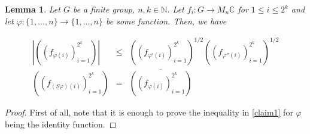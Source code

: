 \documentclass[a4paper,11pt]{amsproc}
\theoremstyle{plain}
\newtheorem{lemma}[theorem]{Lemma}
\theoremstyle{definition}
\begin{document}
\begin{lemma}
Let $G$ be a finite group, $n,k \in \mathbb N$. Let $f_i \colon G \to M_n \mathbb C$ for $1 \leq i \leq 2^k$ and let $\varphi \colon \{1,\dots,n\} \to \{1,\dots,n\}$ be some function. Then, we have

\begin{eqnarray}
|((f_{\varphi(i)})_{i=1}^{2^k})|&\leq & ((f_{\varphi'(i)})_{i=1}^{2^k})^{1/2} \label{claim1}((f_{\varphi''(i)})_{i=1}^{2^k})^{1/2} \\
((f_{(S\varphi)(i)})_{i=1}^{2^k}) &=& \overline{((f_{\varphi(i)})_{i=1}^{2^k})} \label{claim2}
\end{eqnarray}
\end{lemma}
\begin{proof}
First of all, note that it is enough to prove the inequality in \eqref{claim1} for $\varphi$ being the identity function.


\end{proof}
\end{document}
